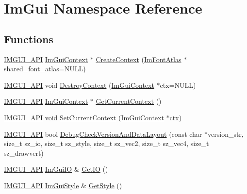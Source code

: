 \hypertarget{namespace_im_gui}{}\section{Im\+Gui Namespace Reference}
\label{namespace_im_gui}
\subsection*{Functions}
\begin{DoxyCompactItemize}
\item 
\mbox{\hyperlink{imgui_8h_a43829975e84e45d1149597467a14bbf5}{I\+M\+G\+U\+I\+\_\+\+A\+PI}} \mbox{\hyperlink{struct_im_gui_context}{Im\+Gui\+Context}} $\ast$ \mbox{\hyperlink{namespace_im_gui_a4ff6c9ad05a0eba37ce1b5ff1607810a}{Create\+Context}} (\mbox{\hyperlink{struct_im_font_atlas}{Im\+Font\+Atlas}} $\ast$shared\+\_\+font\+\_\+atlas=N\+U\+LL)
\item 
\mbox{\hyperlink{imgui_8h_a43829975e84e45d1149597467a14bbf5}{I\+M\+G\+U\+I\+\_\+\+A\+PI}} void \mbox{\hyperlink{namespace_im_gui_ab9132deece575023170cd8e681d0581d}{Destroy\+Context}} (\mbox{\hyperlink{struct_im_gui_context}{Im\+Gui\+Context}} $\ast$ctx=N\+U\+LL)
\item 
\mbox{\hyperlink{imgui_8h_a43829975e84e45d1149597467a14bbf5}{I\+M\+G\+U\+I\+\_\+\+A\+PI}} \mbox{\hyperlink{struct_im_gui_context}{Im\+Gui\+Context}} $\ast$ \mbox{\hyperlink{namespace_im_gui_af557a6de5538099a0f6047eb994bbf42}{Get\+Current\+Context}} ()
\item 
\mbox{\hyperlink{imgui_8h_a43829975e84e45d1149597467a14bbf5}{I\+M\+G\+U\+I\+\_\+\+A\+PI}} void \mbox{\hyperlink{namespace_im_gui_a289dbbbffdadcf1231821d97a7c4a9be}{Set\+Current\+Context}} (\mbox{\hyperlink{struct_im_gui_context}{Im\+Gui\+Context}} $\ast$ctx)
\item 
\mbox{\hyperlink{imgui_8h_a43829975e84e45d1149597467a14bbf5}{I\+M\+G\+U\+I\+\_\+\+A\+PI}} bool \mbox{\hyperlink{namespace_im_gui_ad176ebe838d966eedd373224d9515cfe}{Debug\+Check\+Version\+And\+Data\+Layout}} (const char $\ast$version\+\_\+str, size\+\_\+t sz\+\_\+io, size\+\_\+t sz\+\_\+style, size\+\_\+t sz\+\_\+vec2, size\+\_\+t sz\+\_\+vec4, size\+\_\+t sz\+\_\+drawvert)
\item 
\mbox{\hyperlink{imgui_8h_a43829975e84e45d1149597467a14bbf5}{I\+M\+G\+U\+I\+\_\+\+A\+PI}} \mbox{\hyperlink{struct_im_gui_i_o}{Im\+Gui\+IO}} \& \mbox{\hyperlink{namespace_im_gui_a3179e560812f878f3961ce803a5d9302}{Get\+IO}} ()
\item 
\mbox{\hyperlink{imgui_8h_a43829975e84e45d1149597467a14bbf5}{I\+M\+G\+U\+I\+\_\+\+A\+PI}} \mbox{\hyperlink{struct_im_gui_style}{Im\+Gui\+Style}} \& \mbox{\hyperlink{namespace_im_gui_abafef4bb3e3654efd96a47b2e22870a7}{Get\+Style}} ()

\end{DoxyCompactItemize}
